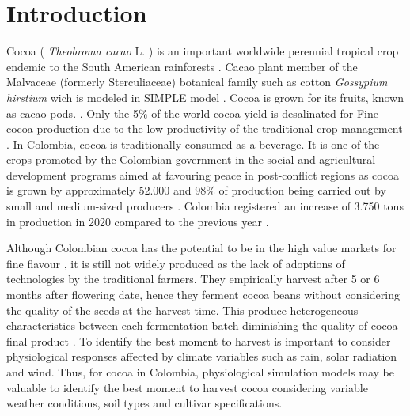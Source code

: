 \documentclass[gene,journal,article,submit,moreauthors,pdftex]{Definitions/mdpi}
\begin{document}

\section{Introduction}
Cocoa ( \textit{Theobroma cacao }L. ) is an important worldwide perennial tropical crop endemic to the South American rainforests \citep{zuidema2005, motamayor2002, argout2011, Rodriguez2019}. Cacao plant member of the Malvaceae (formerly Sterculiaceae)  botanical family such as  cotton \textit{ Gossypium hirstium} \citep{Nix2017cotton} wich is modeled in SIMPLE model \citep{Zao2019simple}. Cocoa is grown for its fruits, known as cacao pods.  \citep{ Niemenak2010, suarez2021}. Only the 5\% of the world cocoa yield is desalinated for Fine-cocoa production due to the low productivity of  the traditional crop management \citep{argout2011}.  In Colombia, cocoa  is  traditionally  consumed  as  a  beverage. It is one of the crops promoted by the Colombian government in the social and agricultural development  programs aimed at favouring peace in post-conflict regions \citep{Rodriguez2019, Abbott2019} as cocoa is grown by approximately 52.000 \citep{Gutierrez2020} and 98\% of production being carried out by small and medium-sized producers \citep{Garcia2014, Escobar2020}. Colombia registered an increase of 3.750 tons in production in 2020 compared to the previous year \citep{lamos2020}. 

Although Colombian cocoa has the potential to be in the high value markets for fine flavour \citep{Escobar2020}, it is still not widely produced as the lack of adoptions of technologies by the traditional farmers. They empirically harvest after 5 or 6 months after flowering date, hence they ferment cocoa beans without considering the  quality of the seeds at the harvest time. This produce heterogeneous characteristics between each fermentation batch diminishing the quality of cocoa final product \citep{Escobar2021}. To identify the best moment to harvest is important to consider physiological responses affected by climate variables such as rain, solar radiation and wind.  Thus,  for cocoa in Colombia, physiological simulation models may be valuable to identify the best moment to harvest cocoa considering variable weather conditions, soil types and cultivar specifications. 
\end{document}
